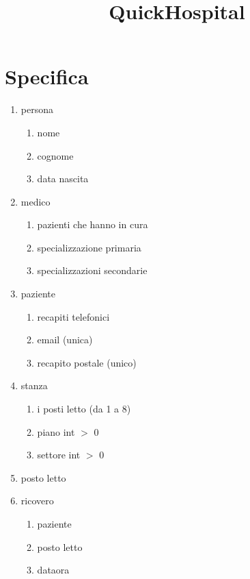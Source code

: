 \documentclass{article}
\title{QuickHospital}
\author{}
\date{}
\begin{document}
\maketitle

\tableofcontents

\newpage

\section{Specifica}

\begin{enumerate}
    \item persona
    \begin{enumerate}
        \item nome
        \item cognome
        \item data nascita
    \end{enumerate}
    \item medico
    \begin{enumerate}
        \item pazienti che hanno in cura
        \item specializzazione primaria
        \item specializzazioni secondarie
    \end{enumerate}
    \item paziente
    \begin{enumerate}
        \item recapiti telefonici
        \item email (unica)
        \item recapito postale (unico)
    \end{enumerate}
    \item stanza
    \begin{enumerate}
        \item i posti letto (da 1 a 8)
        \item piano int $>$ 0
        \item settore int $>$ 0
    \end{enumerate} 
    \item posto letto
    \item ricovero
    \begin{enumerate}
        \item paziente
        \item posto letto
        \item dataora
    \end{enumerate}

\end{enumerate}
\end{document}
